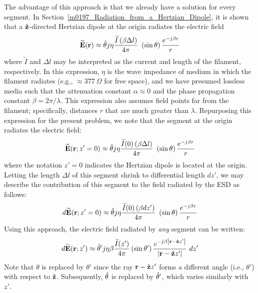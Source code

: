 The advantage of this approach is that we already have a solution for every segment.
In Section~\ref{m0197_Radiation_from_a_Hertzian_Dipole}, it is shown that a $\hat{\bf z}$-directed Hertzian dipole at the origin radiates the electric field
%
\begin{equation}
\widetilde{\bf E}({\bf r}) \approx \hat{\bf \theta} j\eta \frac{\widetilde{I}\left(\beta \Delta l\right)}{4\pi}~\left(\sin\theta\right) \frac{e^{-j\beta r}}{r} 
\end{equation}
%
where $\widetilde{I}$ and $\Delta l$ may be interpreted as the current and length of the filament, respectively.
In this expression, $\eta$ is the wave impedance of medium in which the filament radiates (e.g., $\approx 377~\Omega$ for free space), and we have presumed lossless media such that the attenuation constant $\alpha\approx 0$ and the phase propagation constant $\beta=2\pi/\lambda$.   
This expression also assumes field points far from the filament; specifically, distances $r$ that are much greater than $\lambda$.
Repurposing this expression for the present problem, we note that the segment at the origin radiates the electric field:
%
\begin{equation}
\widetilde{\bf E}({\bf r};z'=0) \approx \hat{\bf \theta} j\eta \frac{\widetilde{I}(0)\left(\beta \Delta l\right)}{4\pi}~\left(\sin\theta\right) \frac{e^{-j\beta r}}{r} 
\end{equation}
%
where the notation $z'=0$ indicates the Hertzian dipole is located at the origin.
Letting the length $\Delta l$ of this segment shrink to differential length $dz'$, we may describe the contribution of this segment to the field radiated by the ESD as follows:
%
\begin{equation}
d\widetilde{\bf E}({\bf r};z'=0) \approx \hat{\bf \theta} j\eta \frac{\widetilde{I}(0)\left(\beta dz'\right)}{4\pi}~\left(\sin\theta\right) \frac{e^{-j\beta r}}{r} 
\end{equation}
% 
Using this approach, the electric field radiated by \emph{any} segment can be written:
%
\begin{equation}
d\widetilde{\bf E}({\bf r};z') \approx 
\hat{\bf \theta}' j\eta\beta \frac{\widetilde{I}(z')}{4\pi}\left(\sin\theta'\right) \frac{e^{-j\beta \left|{\bf r}-\hat{\bf z}z'\right|}}{\left|{\bf r}-\hat{\bf z}z'\right|}~dz'
\end{equation}
%
Note that $\theta$ is replaced by $\theta'$ since the ray ${\bf r}-\hat{\bf z}z'$ forms a different angle (i.e., $\theta'$) with respect to $\hat{\bf z}$.
Subsequently, $\hat{\bf \theta}$ is replaced by $\hat{\bf \theta}'$, which varies similarly with $z'$.
